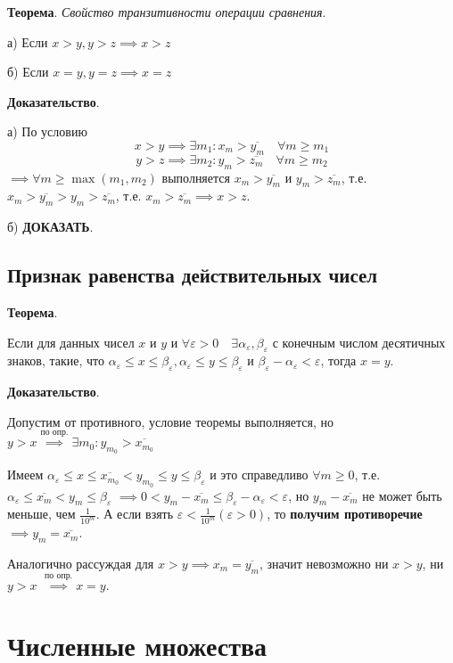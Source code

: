 \documentclass{article}
\newcommand{\bydef}{\stackrel{\text{по опр.}}{\implies}} %
\begin{document}
\textbf{Теорема}. \textit{Свойство транзитивности операции сравнения}.

а) Если $x > y, y > z \implies x > z$

б) Если $x = y, y = z \implies x = z$

\textbf{Доказательство}.

а) По условию 
\[x > y \implies \exists m_1: x_m > \overline{y_m} \quad \forall m \ge m_1\]
\[y > z \implies \exists m_2: y_m > \overline{z_m} \quad \forall m \ge m_2\]
$\implies \forall m \ge \max (m_1, m_2)$ выполняется $x_m > \overline{y_m}$
и $y_m > \overline{z_m}$, т.е. $x_m > \overline{y_m} > y_m > \overline{z_m}$,
т.е. $x_m > \overline{z_m} \implies x > z$.

б) \textbf{ДОКАЗАТЬ}.

\pagebreak

\subsection{Признак равенства действительных чисел}

\textbf{Теорема}.

Если для данных чисел $x$ и $y$ и 
$\forall \varepsilon > 0 \quad \exists \alpha_{\varepsilon}, \beta_{\varepsilon}$
с конечным числом десятичных знаков, такие, что
$\alpha_{\varepsilon} \le x \le \beta_{\varepsilon}, \alpha_{\varepsilon} \le y \le \beta_{\varepsilon}$
и $\beta_{\varepsilon} - \alpha_{\varepsilon} < \varepsilon$, тогда $x = y$.

\textbf{Доказательство}.

Допустим от противного, условие теоремы выполняется, но 
$y > x \bydef \exists m_0: y_{m_0} > \overline{x_{m_0}}$

Имеем $\alpha_{\varepsilon} \le x \le \overline{x_{m_0}} < y_{m_0} \le y \le \beta_{\varepsilon}$
и это справедливо $\forall m \ge 0$, т.е. 
$\alpha_{\varepsilon} \le \overline{x_m} < y_m \le \beta_{\varepsilon}$
$\implies 0 < y_m - \overline{x_m} \le \beta_\varepsilon - \alpha_\varepsilon < \varepsilon$,
но $y_m - \overline{x_m}$ не может быть меньше, чем $\frac{1}{10^m}$. А если взять
$\varepsilon < \frac{1}{10^m} (\varepsilon > 0)$, то \textbf{получим противоречие}
$\implies y_m = \overline{x_m}$.

Аналогично рассуждая для $x > y \implies x_m = \overline{y_m}$, значит невозможно
ни $x > y$, ни $y > x$ $\bydef x = y$.

\section{Численные множества}
\end{document}
